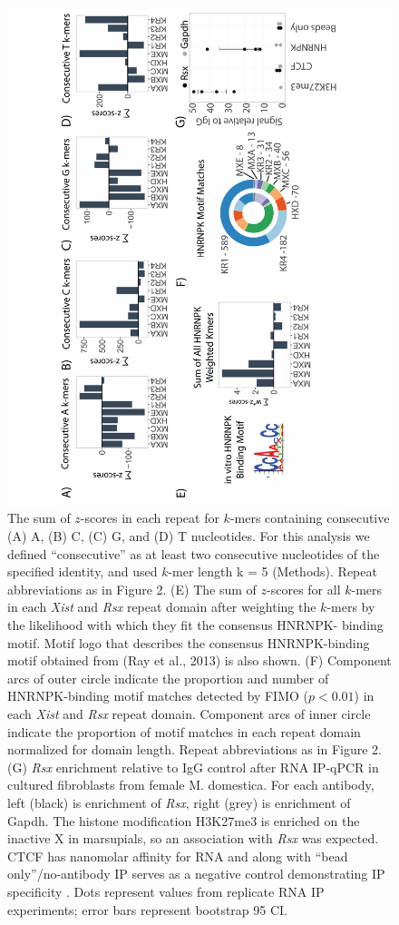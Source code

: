 \begin{figure}[h!]
\centering
\includegraphics[angle=-90, width=.95\textwidth]{images/fig4_G-01.pdf}
\caption[Sequence and motif content in tandem repeats]{The sum of $z$-scores in each repeat for $k$-mers containing consecutive (A) A, (B) C, (C) G, and (D) T nucleotides. For this analysis we defined “consecutive” as at least two consecutive nucleotides of the specified identity, and used $k$-mer length k = 5 (Methods). Repeat abbreviations as in Figure 2. (E) The sum of $z$-scores for all $k$-mers in each \emph{Xist} and \emph{Rsx} repeat domain after weighting the $k$-mers by the likelihood with which they fit the consensus HNRNPK- binding motif. Motif logo that describes the consensus HNRNPK-binding motif obtained from (Ray et al., 2013) is also shown. (F) Component arcs of outer circle indicate the proportion and number of HNRNPK-binding motif matches detected by FIMO ($p<0.01$) in each \emph{Xist} and \emph{Rsx} repeat domain. Component arcs of inner circle indicate the proportion of motif matches in each repeat domain normalized for domain length. Repeat abbreviations as in Figure 2. (G) \emph{Rsx} enrichment relative to IgG control after RNA IP-qPCR in cultured fibroblasts from female M. domestica. For each antibody, left (black) is enrichment of \emph{Rsx}, right (grey) is enrichment of Gapdh. The histone modification H3K27me3 is enriched on the inactive X in marsupials, so an association with \emph{Rsx} was expected. CTCF has nanomolar affinity for RNA and along with “bead only”/no-antibody IP serves as a negative control demonstrating IP specificity \cite{Kung2015Locus-specificCTCF}. Dots represent values from replicate RNA IP experiments; error bars represent bootstrap 95 CI.}
\end{figure}


